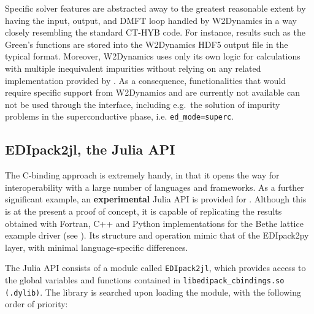 \documentclass[edipack_sp.tex]{subfiles}
\begin{document}

Specific \NAME solver features are abstracted away to the greatest reasonable extent by having the input, output, and DMFT loop handled by W2Dynamics in a way closely resembling the standard CT-HYB code. For instance, results such as the Green's functions are stored into the W2Dynamics HDF5 output file in the typical format. Moreover, W2Dynamics uses only its own logic for calculations with multiple inequivalent impurities without relying on any related implementation provided by . As a consequence, functionalities that would require specific support from W2Dynamics and are currently not available can not be used through the interface, including e.g.\ the solution of impurity problems in the superconductive phase, i.e. {\tt ed\_mode=superc}.



\subsection{EDIpack2jl, the Julia API}\label{sSecInteropEDIjl}
The C-binding approach is extremely handy, in that it opens the way for interoperability  with a large number of languages and frameworks. 
As a further significant example, an {\bf experimental} Julia API 
is provided for \NAME. Although this is at the present a proof of concept, it is capable of replicating the results obtained with Fortran, C++ and
Python implementations for the Bethe lattice example driver (see ).
Its structure and operation mimic that of the EDIpack2py layer, with minimal language-specific differences.

The \NAME{} Julia API consists of a module called {\tt EDIpack2jl}, which provides access to the global variables and functions contained in {\tt  libedipack\_cbindings.so (.dylib)}. 
The library is searched upon loading the module, with the following order of priority:
\end{document}
